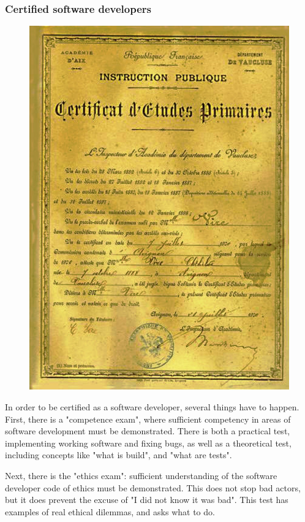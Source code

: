 \begin{frame}[fragile]
\frametitle{Certified software developers}


\begin{figure}
\includegraphics[scale=0.2]{certificate}
\end{figure}

\end{frame}

In order to be certified as a software developer,
several things have to happen.
First,
there is a "competence exam",
where sufficient competency in areas of software development must
be demonstrated.
There is both a practical test,
implementing working software and fixing bugs,
as well as a theoretical test,
including concepts like "what is build",
and "what are tests".

Next,
there is the "ethics exam":
sufficient understanding of the software developer code of ethics
must be demonstrated.
This does not stop bad actors,
but it does prevent the excuse of
"I did not know it was bad".
This test has examples of real ethical dilemmas,
and asks what to do.

